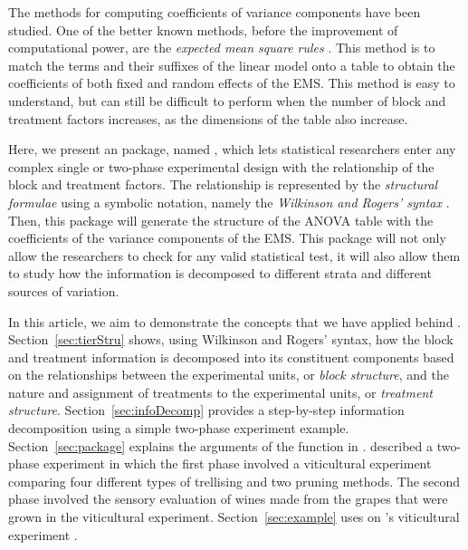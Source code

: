 \documentclass[article]{jss}
\begin{document}
The methods for computing coefficients of variance components have been studied. One of the better known methods, before the improvement of computational power, are the \emph{expected mean square rules} \citep{Montgomery2008}. This method is to match the terms and their suffixes of the linear model onto a table to obtain the coefficients of both fixed and random effects of the EMS. This method is easy to understand, but can still be difficult to perform when the number of block and treatment factors increases, as the dimensions of the table also increase.

Here, we present an  package, named , which lets statistical researchers enter any complex single or two-phase experimental design with the relationship of the block and treatment factors. The relationship is represented by the \emph{structural formulae} using a symbolic notation, namely the \emph{Wilkinson and Rogers' syntax} \citep{Wilkinson1973}. Then, this package will generate the structure of the ANOVA table with the coefficients of the variance components of the EMS. This package will not only allow the researchers to check for any valid statistical test, it will also allow them to study how the information is decomposed to different strata and different sources of variation.

In this article, we aim to demonstrate the concepts that we have applied behind . Section~\ref{sec:tierStru} shows, using Wilkinson and Rogers' syntax, how the block and treatment information is decomposed into its constituent components based on the relationships between the experimental units, or \emph{block structure}, and the nature and assignment of treatments to the experimental units, or \emph{treatment structure}. Section~\ref{sec:infoDecomp} provides a step-by-step information decomposition using a simple two-phase experiment example. Section~\ref{sec:package} explains the arguments of the  function in . \cite{Brien1999} described a two-phase experiment in which the first phase involved a viticultural experiment comparing four different types of trellising and two pruning methods. The second phase involved the sensory evaluation of wines made from the grapes that were grown in the viticultural experiment. Section~\ref{sec:example} uses  on \citeauthor{Brien1999}'s viticultural experiment \citep{Brien1999}. 
\end{document}
